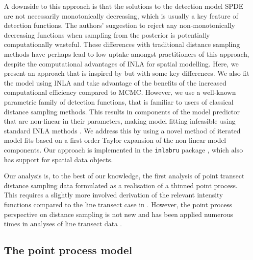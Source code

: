 \documentclass{statsoc}
\begin{document}
A downside to this approach is that the solutions to the detection model SPDE are not necessarily monotonically decreasing, which is usually a key feature of detection functions. The authors' suggestion to reject any non-monotonically decreasing functions when sampling from the posterior is potentially computationally wasteful. These differences with traditional distance sampling methods have perhaps lead to low uptake amongst practitioners of this approach, despite the computational advantages of INLA for spatial modelling. Here, we present an approach that is inspired by \citet{yuan_point_2017} but with some key differences. We also fit the model using INLA and take advantage of the benefits of the increased computational efficiency compared to MCMC.  However, we use a well-known parametric family of detection functions, that is familiar to users of classical distance sampling methods. This results in components of the model predictor that are non-linear in their parameters, making model fitting infeasible using standard INLA methods \citep{rue_approximate_2009}.  We address this by using a novel method of iterated model fits based on a first-order Taylor expansion of the non-linear model components.  Our approach is implemented in the \texttt{inlabru} package \citep{lindgren_inlabru_2024, bachl_inlabru_2019}, which also has support for spatial data objects.

Our analysis is, to the best of our knowledge, the first analysis of point transect distance sampling data formulated as a realisation of a thinned point process.  This requires a slightly more involved derivation of the relevant intensity functions compared to the line transect case in \cite{yuan_point_2017}. However, the point process perspective on distance sampling is not new and has been applied numerous times in analyses of line transect data \citep{buckland_model-based_2016, niemi_bayesian_2010, johnson_model-based_2010, waagepetersen_likelihood-based_2006, hedley_spatial_2004,  hogmander_random_1991, stoyan_remark_1982}.

\subsection{The point process model}
\end{document}
